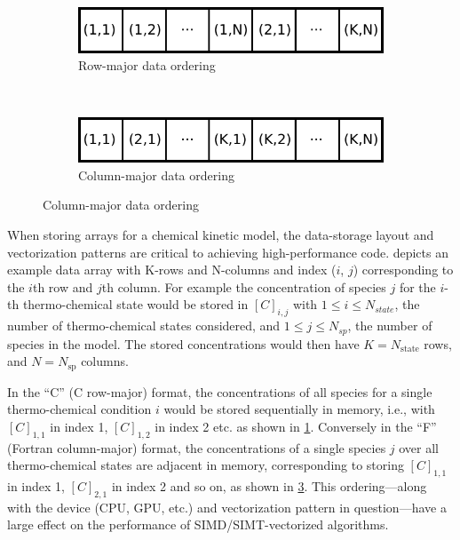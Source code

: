 \documentclass[12pt,number,sort&compress]{elsarticle}
\newcommand{\ns}{N_{sp}}
\begin{document}
\begin{figure}[htb]
\begin{minipage}{0.45\linewidth}
    \begin{subfigure}[t]{\textwidth}
	\includegraphics[width=\textwidth]{row_major.pdf}
	\caption{Row-major data ordering}
	\label{F:row_major}
    \end{subfigure}
    \\
    \begin{subfigure}[t]{\textwidth}
	\includegraphics[width=\textwidth]{column_major.pdf}
	\caption{Column-major data ordering}
	\label{F:column_major}
    \end{subfigure}
  \end{minipage}
\end{figure}

When storing arrays for a chemical kinetic model, the data-storage layout and vectorization patterns are critical to achieving high-performance code.
 depicts an example data array with K-rows and N-columns and index ($i$, $j$) corresponding to the $i$th row and $j$th column.
For example the concentration of species $j$ for the $i$-th thermo-chemical state would be stored in $[C]_{i, j}$ with $1 \le i \le N_{state}$, the number of thermo-chemical states considered, and $1 \le j \le \ns$, the number of species in the model.
The stored concentrations would then have $K = N_{\text{state}}$ rows, and $N = N_{\text{sp}}$ columns.

In the ``C'' (C row-major) format, the concentrations of all species for a single thermo-chemical condition $i$ would be stored sequentially in memory, i.e., with  $[C]_{1, 1}$ in index \num{1}, $[C]_{1, 2}$ in index \num{2} etc. as shown in \cref{F:row_major}.
Conversely in the ``F'' (Fortran column-major) format, the concentrations of a single species $j$ over all thermo-chemical states are adjacent in memory, corresponding to storing $[C]_{1, 1}$ in index \num{1}, $[C]_{2, 1}$ in index \num{2} and so on, as shown in \cref{F:column_major}.
This ordering---along with the device (CPU, GPU, etc.) and vectorization pattern in question---have a large effect on the performance of SIMD\slash SIMT-vectorized algorithms.
\end{document}
